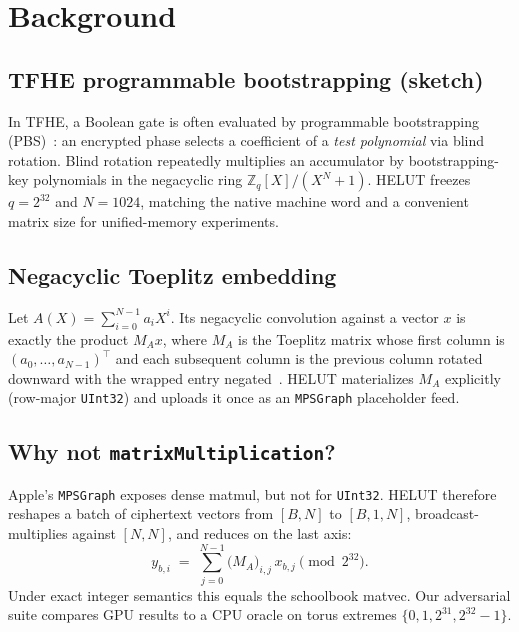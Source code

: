 \documentclass[11pt,a4paper]{article}
\begin{document}
\section{Background}
\label{sec:background}

\subsection{TFHE programmable bootstrapping (sketch)}

In TFHE, a Boolean gate is often evaluated by programmable bootstrapping
(PBS)~\cite{chillotti2020tfhe}: an encrypted phase selects a coefficient of a
\emph{test polynomial} via blind rotation.
Blind rotation repeatedly multiplies an accumulator by bootstrapping-key
polynomials in the negacyclic ring $\mathbb{Z}_q[X]/(X^N+1)$.
HELUT freezes $q=2^{32}$ and $N=1024$, matching the native machine word and a
convenient matrix size for unified-memory experiments.

\subsection{Negacyclic Toeplitz embedding}

Let $A(X)=\sum_{i=0}^{N-1}a_i X^i$.
Its negacyclic convolution against a vector $x$ is exactly the product
$M_A x$, where $M_A$ is the Toeplitz matrix whose first column is
$(a_0,\ldots,a_{N-1})^\top$ and each subsequent column is the previous column
rotated downward with the wrapped entry negated~\cite{lyubashevsky2010ideal}.
HELUT materializes $M_A$ explicitly (row-major \texttt{UInt32}) and uploads it
once as an \texttt{MPSGraph} placeholder feed.

\subsection{Why not \texttt{matrixMultiplication}?}

Apple's \texttt{MPSGraph} exposes dense matmul, but not for \texttt{UInt32}.
HELUT therefore reshapes a batch of ciphertext vectors from $[B,N]$ to
$[B,1,N]$, broadcast-multiplies against $[N,N]$, and reduces on the last axis:
\begin{equation}
  y_{b,i}
  \;=\;
  \sum_{j=0}^{N-1}
  \bigl(M_A\bigr)_{i,j}\,
  x_{b,j}
  \pmod{2^{32}}.
\end{equation}
Under exact integer semantics this equals the schoolbook matvec.
Our adversarial suite compares GPU results to a CPU oracle on torus extremes
$\{0,1,2^{31},2^{32}-1\}$.
\end{document}
